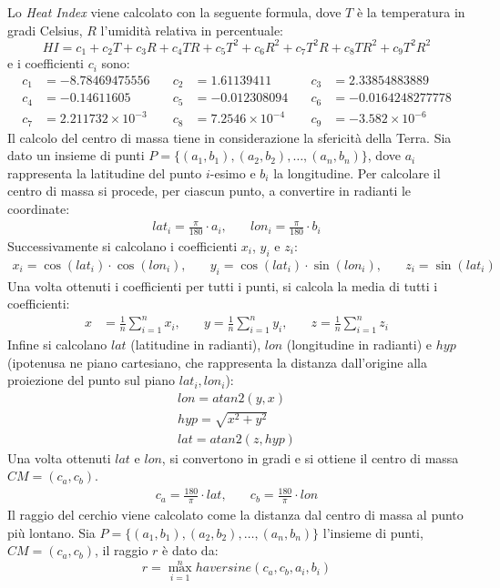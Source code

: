 Lo \textit{Heat Index} viene calcolato con la seguente formula, dove $T$ è la temperatura in gradi Celsius, $R$ l'umidità relativa in percentuale:
\[
	HI = c_1 + c_2 T + c_3 R + c_4 TR + c_5 T^2 + c_6 R^2 + c_7 T^2 R + c_8 TR^2 + c_9 T^2 R^2
\]
e i coefficienti $c_i$ sono:
\[
	\begin{aligned}
		c_1 & = -8.78469475556          & \quad c_2 & = 1.61139411            & \quad c_3 & = 2.33854883889         \\
		c_4 & = -0.14611605             & \quad c_5 & = -0.012308094          & \quad c_6 & = -0.0164248277778      \\
		c_7 & = 2.211732 \times 10^{-3} & \quad c_8 & = 7.2546 \times 10^{-4} & \quad c_9 & = -3.582 \times 10^{-6}
	\end{aligned}
\]
Il calcolo del centro di massa tiene in considerazione la sfericità della Terra. Sia dato un insieme di punti $P = \{(a_1, b_1), (a_2, b_2), \ldots, (a_n, b_n)\}$, dove $a_i$ rappresenta
la latitudine del punto $i$-esimo e $b_i$ la longitudine. Per calcolare il centro di massa si procede, per ciascun punto, a convertire in radianti le coordinate:
\[
	\begin{align*}
		lat_i = \frac{\pi}{180} \cdot a_i, & \quad lon_i = \frac{\pi}{180} \cdot b_i
	\end{align*}
\]
Successivamente si calcolano i coefficienti $x_i$, $y_i$ e $z_i$:
\[
	\begin{align*}
		x_i = \cos(lat_i) \cdot \cos(lon_i),       &
		\quad y_i = \cos(lat_i) \cdot \sin(lon_i), &
		\quad z_i = \sin(lat_i)
	\end{align*}
\]
Una volta ottenuti i coefficienti per tutti i punti, si calcola la media di tutti i coefficienti:
\[
	\begin{aligned}
		x & = \frac{1}{n} \sum_{i=1}^{n} x_i, & \quad y = \frac{1}{n} \sum_{i=1}^{n} y_i, & \quad z = \frac{1}{n} \sum_{i=1}^{n} z_i
	\end{aligned}
\]
Infine si calcolano $lat$ (latitudine in radianti), $lon$ (longitudine in radianti) e $hyp$ (ipotenusa ne piano cartesiano, che rappresenta la distanza dall'origine alla proiezione del punto sul piano $lat_i, lon_i$):
\begin{align*}
	lon = atan2(y, x)      \\
	hyp = \sqrt{x^2 + y^2} \\
	lat = atan2(z, hyp)
\end{align*}
Una volta ottenuti $lat$ e $lon$, si convertono in gradi e si ottiene il centro di massa $CM = (c_a, c_b)$.
\[
	\begin{align*}
		c_a = \frac{180}{\pi} \cdot lat, & \quad c_b = \frac{180}{\pi} \cdot lon
	\end{align*}
\]
Il raggio del cerchio viene calcolato come la distanza dal centro di massa al punto più lontano. Sia $P = \{(a_1, b_1), (a_2, b_2), \ldots, (a_n, b_n)\}$ l'insieme di punti, $CM = (c_a, c_b)$, il
raggio $r$ è dato da:
\[
	r = \max_{i=1}^{n} haversine(c_a, c_b, a_i, b_i)
\]


